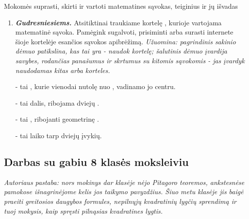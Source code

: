 \documentclass{article}
\begin{document}
\begin{mybox}{Mokomės suprasti$\text{,}$ skirti ir vartoti matematines sąvokas$\text{,}$ teiginius ir jų išvadas}
\begin{enumerate}
vadinasi, \textit{\colorbox{blue!35!white}{}}

\textit{\colorbox{green!30!white}{}}, o 

\textit{\colorbox{green!30!white}{}},

vadinasi, \textit{\colorbox{green!30!white}{}}

\textit{\textbf{Samprotavimų rezultatas:} prastų pažymių dažnumas didėja tada ir tik tada, kai pamokos nuobodumas didėja.}

\item \textbf{\textit{Gudresniesiems.}} Atsitiktinai traukiame kortelę , kurioje vartojama matematinė sąvoka. Pamėgink sugalvoti, prisiminti arba surasti internete šioje kortelėje esančios sąvokos apibrėžimą. \textit{Užuomina: pagrindinis sakinio dėmuo patikslina, kas tai yra - naudok  kortelę; šalutinis dėmuo įvardija savybes, rodančias panašumus ir skrtumus su kitomis sąvokomis - jas įvardyk naudodamas kitas  arba  korteles.}

 - tai  , kurie vienodai nutolę nuo , vadinamo jo centru.

 - tai  dalis, ribojama dviejų .

 - tai , ribojanti geometrinę .

 - tai laiko  tarp dviejų įvykių.
\end{enumerate}
\end{mybox}
\subsection{Darbas su gabiu 8 klasės moksleiviu}
\textit{Autoriaus pastaba: nors mokinys dar klasėje nėjo Pitagoro teoremos, ankstesnėse pamokose išnagrinėjome kelis jos taikymo pavyzdžius. Šiuo metu klasėje jis baigė praeiti greitosios daugybos formules, nepilnųjų kvadratinių lygčių sprendimą ir tuoj mokysis, kaip spręsti pilnąsias kvadratines lygtis.}
\end{document}
